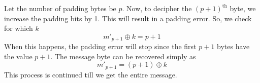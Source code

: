 \documentclass[a4paper, 11pt]{article}
\begin{document}
Let the number of padding bytes be $p$. Now, to decipher the $(p+1)^\text{th}$ byte, we increase the padding bits by 1. This will result in a padding error. So, we check for which $k$
$$m'_{p+1}\oplus k = p+1$$
When this happens, the padding error will stop since the first $p+1$ bytes have the value $p+1$. The message byte can be recovered simply as
$$m'_{p+1} = (p+1)\oplus k$$
This process is continued till we get the entire message.
\end{document}
